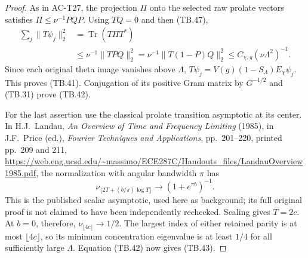 \begin{proof}
As in AC-T27, the projection \(\Pi\) onto the selected raw
prolate vectors satisfies \(\Pi\leq\nu^{-1}PQP\).
Using \(TQ=0\) and then (TB.47),
\[
 \begin{split}
 \sum_j\|T\psi_j\|_2^2
   &=\operatorname{Tr}(T\Pi T^*)\\
   &\leq\nu^{-1}\|TPQ\|_2^2
    =\nu^{-1}\|T(1-P)Q\|_2^2
    \leq C_{\chi,g}(\nu\Lambda^2)^{-1}.
 \end{split}
 \tag{TB.48}
\]
Since each original theta image vanishes above \(\Lambda\),
\(T\psi_j=V(g)(1-S_\Lambda)E_\chi\psi_j\).
This proves (TB.41).
Conjugation of its positive Gram matrix by \(G^{-1/2}\)
and (TB.31) prove (TB.42).

For the last assertion use the classical prolate transition
asymptotic at its center.  In H.J.~Landau,
\emph{An Overview of Time and Frequency Limiting} (1985),
in J.F.~Price (ed.), \emph{Fourier Techniques and Applications},
pp.~201--220, printed pp.~209 and 211,
\url{https://web.eng.ucsd.edu/~massimo/ECE287C/Handouts_files/LandauOverview1985.pdf},
the normalization with angular
bandwidth \(\pi\) has
\[
 \nu_{\lfloor2T+(b/\pi)\log T\rfloor}
                  \longrightarrow(1+e^{\pi b})^{-1}.
 \tag{TB.49}
\]
This is the published scalar asymptotic, used here as
background; its full original proof is not claimed to have
been independently rechecked.  Scaling gives \(T=2c\).
At \(b=0\), therefore, \(\nu_{\lfloor4c\rfloor}\to1/2\).
The largest index of either retained parity is at most
\(\lfloor4c\rfloor\), so its minimum concentration eigenvalue
is at least \(1/4\) for all sufficiently large \(\Lambda\).
Equation (TB.42) now gives (TB.43).
\end{proof}

